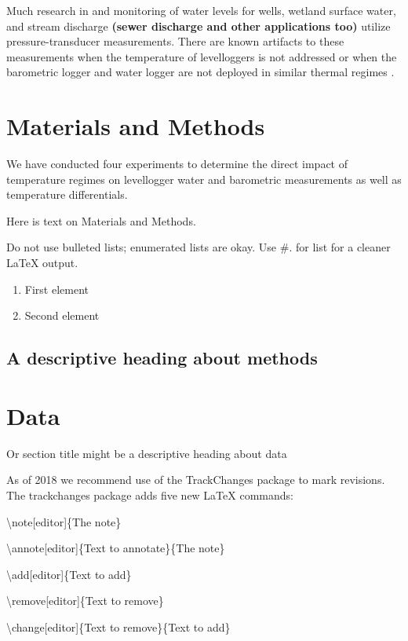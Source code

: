 \documentclass[draft,linenumbers]{agujournal2018}
\begin{document}
Much research in and monitoring of water levels for wells, wetland
surface water, and stream discharge \textbf{(sewer discharge and other
applications too)} utilize pressure-transducer measurements. There are
known artifacts to these measurements when the temperature of
levelloggers is not addressed \citep{moore-2016} or when the barometric
logger and water logger are not deployed in similar thermal regimes
\citep{cuevas-2010, mclaughlin-2011}.

\section{Materials and Methods}

We have conducted four experiments to determine the direct impact of
temperature regimes on levellogger water and barometric measurements as
well as temperature differentials.

Here is text on Materials and Methods.

Do not use bulleted lists; enumerated lists are okay. Use \#. for list
for a cleaner LaTeX output.

\begin{enumerate}
\item
  First element
\item
  Second element
\end{enumerate}

\subsection{A descriptive heading about methods}

\section{Data}

Or section title might be a descriptive heading about data

As of 2018 we recommend use of the TrackChanges package to mark
revisions. The trackchanges package adds five new LaTeX commands:

\textbackslash{}note{[}editor{]}\{The note\}

\textbackslash{}annote{[}editor{]}\{Text to annotate\}\{The note\}

\textbackslash{}add{[}editor{]}\{Text to add\}

\textbackslash{}remove{[}editor{]}\{Text to remove\}

\textbackslash{}change{[}editor{]}\{Text to remove\}\{Text to add\}
\end{document}
